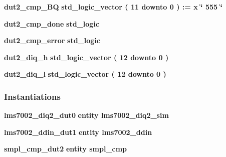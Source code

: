 \begin{DoxyCompactItemize}
\item 
{\bf dut2\+\_\+cmp\+\_\+\+BQ} {\bfseries \textcolor{comment}{std\+\_\+logic\+\_\+vector}\textcolor{vhdlchar}{ }\textcolor{vhdlchar}{(}\textcolor{vhdlchar}{ }\textcolor{vhdlchar}{ } \textcolor{vhdldigit}{11} \textcolor{vhdlchar}{ }\textcolor{keywordflow}{downto}\textcolor{vhdlchar}{ }\textcolor{vhdlchar}{ } \textcolor{vhdldigit}{0} \textcolor{vhdlchar}{ }\textcolor{vhdlchar}{)}\textcolor{vhdlchar}{ }\textcolor{vhdlchar}{ }\textcolor{vhdlchar}{ }\textcolor{vhdlchar}{\+:}\textcolor{vhdlchar}{=}\textcolor{vhdlchar}{ }\textcolor{vhdlchar}{ }\textcolor{vhdlchar}{x}\textcolor{vhdlchar}{ }\textcolor{keyword}{\char`\"{} 555 \char`\"{}}\textcolor{vhdlchar}{ }} 
\item 
{\bf dut2\+\_\+cmp\+\_\+done} {\bfseries \textcolor{comment}{std\+\_\+logic}\textcolor{vhdlchar}{ }} 
\item 
{\bf dut2\+\_\+cmp\+\_\+error} {\bfseries \textcolor{comment}{std\+\_\+logic}\textcolor{vhdlchar}{ }} 
\item 
{\bf dut2\+\_\+diq\+\_\+h} {\bfseries \textcolor{comment}{std\+\_\+logic\+\_\+vector}\textcolor{vhdlchar}{ }\textcolor{vhdlchar}{(}\textcolor{vhdlchar}{ }\textcolor{vhdlchar}{ } \textcolor{vhdldigit}{12} \textcolor{vhdlchar}{ }\textcolor{keywordflow}{downto}\textcolor{vhdlchar}{ }\textcolor{vhdlchar}{ } \textcolor{vhdldigit}{0} \textcolor{vhdlchar}{ }\textcolor{vhdlchar}{)}\textcolor{vhdlchar}{ }} 
\item 
{\bf dut2\+\_\+diq\+\_\+l} {\bfseries \textcolor{comment}{std\+\_\+logic\+\_\+vector}\textcolor{vhdlchar}{ }\textcolor{vhdlchar}{(}\textcolor{vhdlchar}{ }\textcolor{vhdlchar}{ } \textcolor{vhdldigit}{12} \textcolor{vhdlchar}{ }\textcolor{keywordflow}{downto}\textcolor{vhdlchar}{ }\textcolor{vhdlchar}{ } \textcolor{vhdldigit}{0} \textcolor{vhdlchar}{ }\textcolor{vhdlchar}{)}\textcolor{vhdlchar}{ }} 
\end{DoxyCompactItemize}
\subsubsection*{Instantiations}
 \begin{DoxyCompactItemize}
\item 
{\bf lms7002\+\_\+diq2\+\_\+dut0}  {\bfseries entity lms7002\+\_\+diq2\+\_\+sim}   
\item 
{\bf lms7002\+\_\+ddin\+\_\+dut1}  {\bfseries entity lms7002\+\_\+ddin}   
\item 
{\bf smpl\+\_\+cmp\+\_\+dut2}  {\bfseries entity smpl\+\_\+cmp}   
\end{DoxyCompactItemize}


